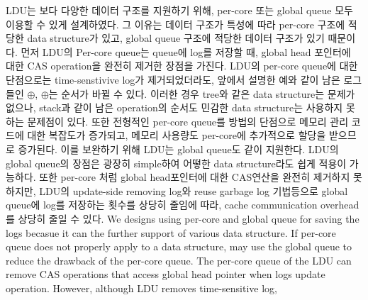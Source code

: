 \ifkor
LDU는 보다 다양한 데이터 구조를 지원하기 위해, per-core 또는 global queue 모두 이용할 수 있게 설계하였다.
그 이유는 데이터 구조가 특성에 따라 per-core 구조에 적당한 data structure가 있고,
global queue 구조에 적당한 데이터 구조가 있기 때문이다.
먼저 LDU의 Per-core queue는 queue에 log를 저장할 때, global head 포인터에 대한 CAS operation을
완전히 제거한 장점을 가진다.
LDU의 per-core queue에 대한 단점으로는 time-senstivive log가 제거되었더라도,
앞에서 설명한 예와 같이 남은 로그들인 $\oplus$, $\oplus$는 순서가 바뀔 수 있다.
이러한 경우 tree와 같은 data structure는 문제가 없으나, stack과 같이 남은 operation의
순서도 민감한 data structure는 사용하지 못하는 문제점이 있다.
또한 전형적인 per-core queue를 방법의 단점으로 메모리 관리 코드에 대한 복잡도가 증가되고, 
메모리 사용량도 per-core에 추가적으로 할당을 받으므로 증가된다.
이를 보완하기 위해 LDU는 global queue도 같이 지원한다.
LDU의 global queue의 장점은 광장히 simple하여 어떻한 data structure라도 쉽게 적용이 가능하다.
또한 per-core 처럼 global head포인터에 대한 CAS연산을 완전히 제거하지 못하지만, LDU의 update-side
removing log와 reuse garbage log 기법등으로 global queue에 log를 저장하는 횟수를 상당히 줄임에 따라,
cache communication overhead를 상당히 줄일 수 있다.
\else
We designs using per-core and global queue for saving the logs becasue it
can the further support of various data structure.
If per-core queue does not properly apply to a data structure, may use the
global queue to reduce the drawback of the per-core queue.
The per-core queue of the LDU can remove CAS operations that access global head
pointer when logs update operation. 
However, although LDU removes time-sensitive log, 
